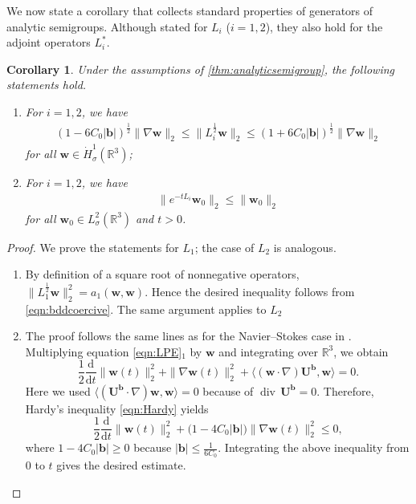 \documentclass[10pt]{amsart}
\theoremstyle{plain}
\newtheorem{corollary}[lemma]{Corollary}
\theoremstyle{definition}
\theoremstyle{remark}
\numberwithin{equation}{section}
\newcommand{\R}{\mathbb{R}}
\newcommand{\bb}{{\boldsymbol{b}}}
\newcommand{\bU}{{\boldsymbol{U}}}
\newcommand{\bw}{{\boldsymbol{w}}}
\begin{document}
We now state a corollary that collects standard properties of generators of analytic semigroups.
Although stated for $L_i$ ($i=1,2$), they also hold for the adjoint operators $L_i^*$.


\begin{corollary}
Under the assumptions of \cref{thm:analyticsemigroup}, the following statements hold.
\begin{enumerate}[label={(\roman*)}]
\item  For $i=1,2$, we have 
\begin{align}\label{eqn:corollary1}
(1-6C_0|\bb|)^{\frac{1}{2}} \| \nabla \bw \|_2 \le 
\| L_i^{\frac{1}{2}} \bw \|_2 \le (1+6C_0|\bb|)^{\frac{1}{2}} \| \nabla \bw \|_2  
\end{align}
for all $\bw\in \dot H^1_\sigma(\R^3)$;

\item For $i=1,2$, we have 
\begin{align}\label{eqn:corollary2}
\|e^{-tL_i}\bw_0\|_2 \le \| \bw_0\|_2  
\end{align}
for all $\bw_0\in L^2_\sigma(\R^3)$ and $t>0$.
\end{enumerate}
\end{corollary}

\begin{proof}
We prove the statements for $L_1$; the case of $L_2$ is analogous.
\begin{enumerate}[label={(\roman*)}]
\item By definition of a square root of nonnegative operators, $\|L_1^{\frac{1}{2}} \bw \|_2^2 = a_1(\bw, \bw)$. 
Hence the desired inequality follows from \cref{eqn:bddcoercive}. The same argument applies to $L_2$
\item The proof follows the same lines as for the Navier--Stokes case in \cite[Corollary 4.4]{KarchPilarczyk2011}. Multiplying equation \cref{eqn:LPE}$_1$ by $\bw$ and integrating over $\R^3$, we obtain 
\begin{equation*}
\frac{1}{2}\frac{\mathrm d}{\mathrm d t}\| \bw(t) \|^2_2+\| \nabla \bw(t)\|_2^2 
+\langle (\bw \cdot \nabla )\bU^\bb, \bw \rangle
=0.
\end{equation*}
Here we used $\langle (\bU^\bb \cdot \nabla )\bw, \bw \rangle=0$ because of $\operatorname{div}\, \bU^\bb=0$.
Therefore, Hardy's inequality \cref{eqn:Hardy} yields
\begin{equation*} 
   \frac{1}{2}\frac{\mathrm d}{\mathrm d t}\| \bw(t)\|^2_2 + \big( 1- 4C_0 |\bb| \big)\| \nabla \bw(t)\|_2^2\le 0,
\end{equation*}
where $1- 4C_0 |\bb|\ge 0$ because $|\bb|\le \frac{1}{6C_0}$. 
Integrating the above inequality from $0$ to $t$ gives the desired estimate.
\end{enumerate}
\end{proof}
\end{document}
